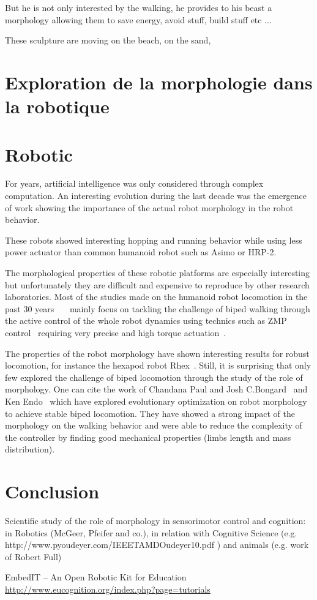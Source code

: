 But he is not only interested by the walking, he provides to his beast a morphology allowing them to save energy, avoid stuff, build stuff etc ...

These sculpture are moving on the beach, on the sand,


\section{Exploration de la morphologie dans la robotique} %




\section{Robotic} %
For years, artificial intelligence was only considered through complex computation.
An interesting evolution during the last decade was the emergence of work showing the importance of the actual robot morphology in the robot behavior.






These robots showed interesting hopping and running behavior while using less power actuator than common humanoid robot such as Asimo or HRP-2.



The morphological properties of these robotic platforms are especially interesting but unfortunately they are difficult and expensive to reproduce by other research laboratories.
Most of the studies made on the humanoid robot locomotion in the past 30 years~\cite{park1998biped}~\cite{aoi2005locomotion}~\cite{park1998biped} mainly focus on tackling the challenge of biped walking through the active control of the whole robot dynamics using technics such as ZMP control~\cite{vukobratovic2004zero} requiring very precise and high torque actuation~\cite{akachi2005development}.

The properties of the robot morphology have shown interesting results for robust locomotion, for instance the hexapod robot Rhex~\cite{saranli2001rhex}.
Still, it is surprising that only few explored the challenge of biped locomotion through the study of the role of morphology.
One can cite the work of Chandana Paul and Josh C.Bongard~\cite{paul2001road} and Ken Endo~\cite{endo2002co} which have explored evolutionary optimization on robot morphology to achieve stable biped locomotion.
They have showed a strong impact of the morphology on the walking behavior and were able to reduce the complexity of the controller by finding good mechanical properties (limbs length and mass distribution).


\section{Conclusion} %

Scientific study of the role of morphology in sensorimotor control and cognition: in Robotics (McGeer, Pfeifer and co.), in relation with Cognitive Science (e.g.
http://www.pyoudeyer.com/IEEETAMDOudeyer10.pdf ) and animals (e.g.
work of Robert Full)

EmbedIT – An Open Robotic Kit for Education
\url{http://www.eucognition.org/index.php?page=tutorials}
